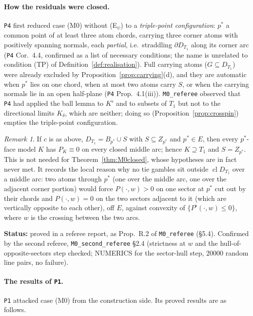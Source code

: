 \documentclass[11pt]{article}
\theoremstyle{definition}
\theoremstyle{remark}
\newtheorem{remark}[theorem]{Remark}
\newcommand{\cl}{\operatorname{cl}}
\newcommand{\src}[1]{\texttt{#1}}
\newcommand{\status}[1]{\par\smallskip\noindent\textbf{Status:} #1\par\smallskip}
\begin{document}
\paragraph{How the residuals were closed.} \src{P4} first reduced case (M0) without (E$_\psi$) to a \emph{triple-point configuration}: $p^*$ a common point of at least three atom chords, carrying three corner atoms with positively spanning normals, each \emph{partial}, i.e.\ straddling $\partial D_{T_1}$ along its corner arc (\src{P4} Cor.~4.4, confirmed as a list of necessary conditions; the name is unrelated to condition (TP) of Definition~\ref{def:realisation}). Full carrying atoms ($G\subseteq D_{T_1}$) were already excluded by Proposition~\ref{prop:carrying}(d), and they are automatic when $p^*$ lies on one chord, when at most two atoms carry $S$, or when the carrying normals lie in an open half-plane (\src{P4} Prop.~4.1(iii)). \src{M0\_referee} observed that \src{P4} had applied the ball lemma to $K^\flat$ and to subsets of $T_1$ but not to the directional limits $K_\delta$, which are neither; doing so (Proposition~\ref{prop:crosspin}) empties the triple-point configuration.

\begin{remark}\label{rem:midarc}
If $c$ is as above, $D_{T_1}=B_{p^*}\cup S$ with $S\subseteq Z_{p^*}$ and $p^*\in E$, then every $p^*$-face model $K$ has $P_K\equiv0$ on every closed middle arc; hence $K\supseteq T_1$ and $S=Z_{p^*}$. This is not needed for Theorem~\ref{thm:M0closed}, whose hypotheses are in fact never met. It records the local reason why no tie gambles sit outside $\cl D_{T_1}$ over a middle arc: two atoms through $p^*$ (one over the middle arc, one over the adjacent corner portion) would force $P(\cdot,w)>0$ on one sector at $p^*$ cut out by their chords and $P(\cdot,w)=0$ on the two sectors adjacent to it (which are vertically opposite to each other), off $E$, against convexity of $\{P^\flat(\cdot,w)\le0\}$, where $w$ is the crossing between the two arcs.
\end{remark}
\status{proved in a referee report, as Prop.~R.2 of \src{M0\_referee} (\S5.4). Confirmed by the second referee, \src{M0\_second\_referee} \S2.4 (strictness at $w$ and the hull-of-opposite-sectors step checked; NUMERICS for the sector-hull step, 20000 random line pairs, no failure).}

\paragraph{The results of \src{P1}.} \src{P1} attacked case (M0) from the construction side. Its proved results are as follows.
\end{document}
